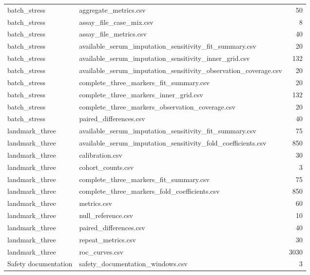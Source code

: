 \begin{longtable}{p{20mm}p{115mm}r}
batch\_stress & aggregate\_metrics.csv & 50 \\
batch\_stress & assay\_file\_case\_mix.csv & 8 \\
batch\_stress & assay\_file\_metrics.csv & 40 \\
batch\_stress & available\_serum\_imputation\_sensitivity\_fit\_summary.csv & 20 \\
batch\_stress & available\_serum\_imputation\_sensitivity\_inner\_grid.csv & 132 \\
batch\_stress & available\_serum\_imputation\_sensitivity\_observation\_coverage.csv & 20 \\
batch\_stress & complete\_three\_markers\_fit\_summary.csv & 20 \\
batch\_stress & complete\_three\_markers\_inner\_grid.csv & 132 \\
batch\_stress & complete\_three\_markers\_observation\_coverage.csv & 20 \\
batch\_stress & paired\_differences.csv & 40 \\
landmark\_three & available\_serum\_imputation\_sensitivity\_fit\_summary.csv & 75 \\
landmark\_three & available\_serum\_imputation\_sensitivity\_fold\_coefficients.csv & 850 \\
landmark\_three & calibration.csv & 30 \\
landmark\_three & cohort\_counts.csv & 3 \\
landmark\_three & complete\_three\_markers\_fit\_summary.csv & 75 \\
landmark\_three & complete\_three\_markers\_fold\_coefficients.csv & 850 \\
landmark\_three & metrics.csv & 60 \\
landmark\_three & null\_reference.csv & 10 \\
landmark\_three & paired\_differences.csv & 40 \\
landmark\_three & repeat\_metrics.csv & 30 \\
landmark\_three & roc\_curves.csv & 3030 \\
Safety documentation & safety\_documentation\_windows.csv & 3 \\
\bottomrule\end{longtable}
